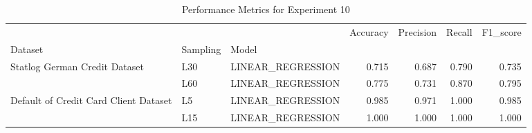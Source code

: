 \begin{table}
\caption{Performance Metrics for Experiment 10}
\label{tab:experiment_10_results}
\begin{tabular}{lllrrrr}
\toprule
 &  &  & Accuracy & Precision & Recall & F1\_score \\
Dataset & Sampling & Model &  &  &  &  \\
\midrule
\multirow[t]{2}{*}{Statlog German Credit Dataset} & L30 & LINEAR\_REGRESSION & 0.715 & 0.687 & 0.790 & 0.735 \\
\cline{2-7}
 & L60 & LINEAR\_REGRESSION & 0.775 & 0.731 & 0.870 & 0.795 \\
\cline{1-7} \cline{2-7}
\multirow[t]{2}{*}{Default of Credit Card Client Dataset} & L5 & LINEAR\_REGRESSION & 0.985 & 0.971 & 1.000 & 0.985 \\
\cline{2-7}
 & L15 & LINEAR\_REGRESSION & 1.000 & 1.000 & 1.000 & 1.000 \\
\cline{1-7} \cline{2-7}
\bottomrule
\end{tabular}
\end{table}
